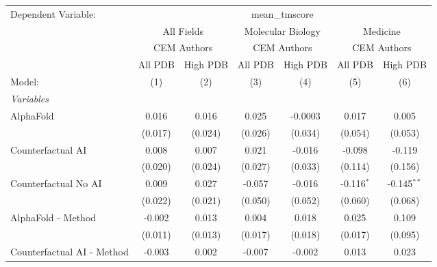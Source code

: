 \begingroup
\centering
\begin{tabular}{lcccccc}
   \tabularnewline \midrule \midrule
   Dependent Variable: & \multicolumn{6}{c}{mean\_tmscore}\\
 & \multicolumn{2}{c}{All Fields} & \multicolumn{2}{c}{Molecular Biology} & \multicolumn{2}{c}{Medicine} \\
\cmidrule(lr){2-3} \cmidrule(lr){4-5} \cmidrule(lr){6-7}
 & \multicolumn{2}{c}{CEM Authors} & \multicolumn{2}{c}{CEM Authors} & \multicolumn{2}{c}{CEM Authors} \\
\cmidrule(lr){2-3} \cmidrule(lr){4-5} \cmidrule(lr){6-7}
 & \multicolumn{1}{c}{All PDB} & \multicolumn{1}{c}{High PDB} & \multicolumn{1}{c}{All PDB} & \multicolumn{1}{c}{High PDB} & \multicolumn{1}{c}{All PDB} & \multicolumn{1}{c}{High PDB} \\
\cmidrule(lr){2-2} \cmidrule(lr){3-3} \cmidrule(lr){4-4} \cmidrule(lr){5-5} \cmidrule(lr){6-6} \cmidrule(lr){7-7}
   Model:                                                     & (1)     & (2)     & (3)     & (4)     & (5)          & (6)\\  
   \midrule
   \emph{Variables}\\
   AlphaFold                                                  & 0.016   & 0.016   & 0.025   & -0.0003 & 0.017        & 0.005\\   
                                                              & (0.017) & (0.024) & (0.026) & (0.034) & (0.054)      & (0.053)\\   
   Counterfactual AI                                          & 0.008   & 0.007   & 0.021   & -0.016  & -0.098       & -0.119\\   
                                                              & (0.020) & (0.024) & (0.027) & (0.033) & (0.114)      & (0.156)\\   
   Counterfactual No AI                                       & 0.009   & 0.027   & -0.057  & -0.016  & -0.116$^{*}$ & -0.145$^{**}$\\   
                                                              & (0.022) & (0.021) & (0.050) & (0.052) & (0.060)      & (0.068)\\   
   AlphaFold - Method                                         & -0.002  & 0.013   & 0.004   & 0.018   & 0.025        & 0.109\\   
                                                              & (0.011) & (0.013) & (0.017) & (0.018) & (0.017)      & (0.095)\\   
   Counterfactual AI - Method                                 & -0.003  & 0.002   & -0.007  & -0.002  & 0.013        & 0.023\\   

\end{tabular}
